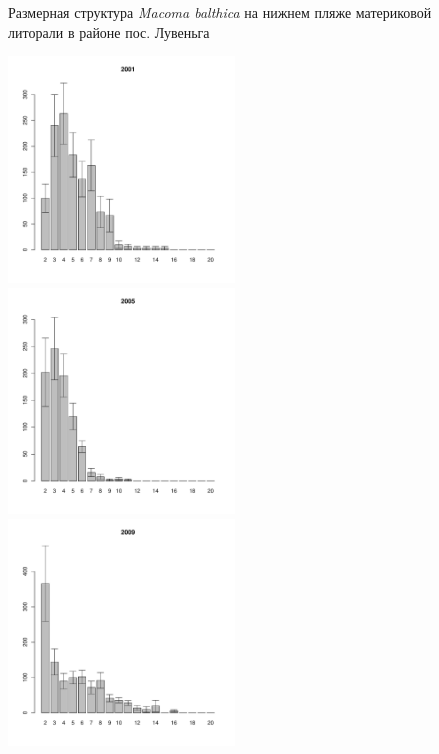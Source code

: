 \documentclass[12pt, a4paper]{article}
\begin{document}
\begin{figure}[h]
\begin{multicols}{3}
\end{multicols}


\caption{Размерная структура {\it Macoma balthica} на нижнем пляже материковой литорали в районе пос. Лувеньга}
\label{ris:size_str_2razrez_low}
\end{figure}



\newpage \begin{figure}[h] 

\begin{multicols}{3}
\hfill
\includegraphics[width=60mm]{../White_Sea/Ryashkov_YuG/YuG2_2001_.pdf}
\hfill
\includegraphics[width=60mm]{../White_Sea/Ryashkov_YuG/YuG2_2005_.pdf}
\hfill
\includegraphics[width=60mm]{../White_Sea/Ryashkov_YuG/YuG2_2009_.pdf}
\end{multicols}


\end{figure}
\end{document}
